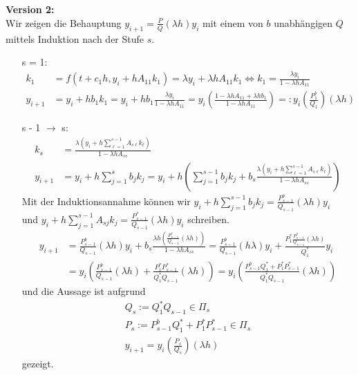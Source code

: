 \\
\\
\begin{solution}
\textbf{Version 2:} \\
Wir zeigen die Behauptung $y_{i+1} = \frac{P}{Q}(\lambda h)y_i$ mit einem von $b$
unabhängigen $Q$ mittels Induktion nach der Stufe $s$. \\
\begin{itemize}
  \item [s = 1:]
  \begin{align*}
    k_1 &= f(t + c_1h,y_i + hA_{11}k_1) = \lambda y_i + \lambda  hA_{11}k_1 \iff k_1 = \frac{\lambda y_i}{1 - \lambda hA_{11}} \\
    y_{i+1} &= y_i + hb_1k_1 = y_i + hb_1\frac{\lambda y_i}{1 - \lambda hA_{11}}
    = y_i\left(\frac{1 - \lambda hA_{11} + \lambda hb_1}{1 - \lambda h A_{11}}\right) =: y_i\left(\frac{P_1^b}{Q_1}\right)(\lambda h)
  \end{align*}
  \item [s - 1 $\rightarrow$ s:]
  \begin{align*}
    k_s &= \frac{\lambda\left(y_i + h\sum_{\ell=1}^{s-1}A_{s\ell}k_{\ell}\right)}{1 - \lambda h A_{ss}}\\
    y_{i+1} &= y_i + h\sum_{j=1}^sb_jk_j = y_i + h\left(\sum_{j=1}^{s-1}b_jk_j + b_s\frac{\lambda\left(y_i + h\sum_{\ell=1}^{s-1}A_{s\ell}k_{\ell}\right)}{1 - \lambda h A_{ss}}\right)
  \end{align*}
  Mit der Induktionsannahme können wir $y_i + h\sum_{j=1}^{s-1}b_jk_j = \frac{P_{s-1}^b}{Q_{s-1}}(\lambda h)y_i$ \\
  und $y_i + h\sum_{j=1}^{s-1}A_{sj}k_j = \frac{P_{s-1}^*}{Q_{s-1}}(\lambda h)y_i $ schreiben.
  \begin{align*}
    y_{i+1} &= \frac{P_{s-1}^b}{Q_{s-1}}(\lambda h)y_i + b_s\frac{\lambda h\left(\frac{P_{s-1}^*}{Q_{s-1}}(\lambda h)\right)}{1 - \lambda h A_{ss}}
    = \frac{P_{s-1}^b}{Q_{s-1}}(h\lambda)y_i + \frac{P_1^*\frac{P_{s-1}^*}{Q_{s-1}}(\lambda h)}{Q_1^*}y_i \\
    &= y_i\left(\frac{P_{s-1}^b}{Q_{s-1}}(\lambda h) + \frac{P_1^*P_{s-1}^*}{Q_1^*Q_{s-1}}(\lambda h)\right)
    = y_i\left(\frac{P_{s-1}^bQ_1^* + P_1^*P_{s-1}^*}{Q_1^*Q_{s-1}}(\lambda h)\right)
  \end{align*}
  und die Aussage ist aufgrund
  \begin{align*}
    Q_s := Q_1^*Q_{s-1} \in \Pi_s \\
    P_s := P_{s-1}^bQ_1^* + P_1^*P_{s-1}^* \in \Pi_s \\
    y_{i+1} = y_i\left(\frac{P_s}{Q_s}\right)(\lambda h)
  \end{align*}
  gezeigt.
\end{itemize}
\end{solution}
